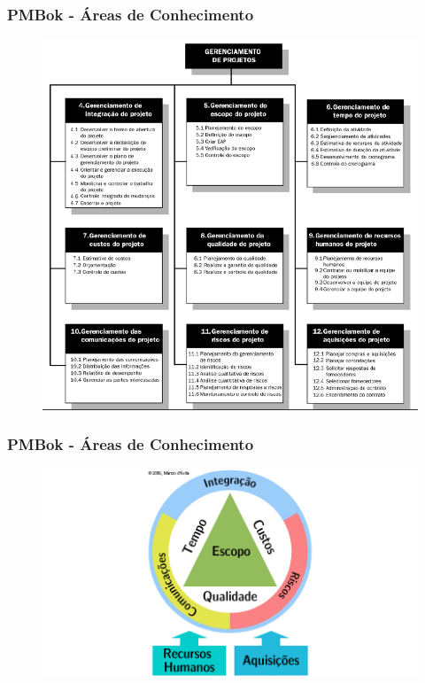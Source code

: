         \begin{frame}
 \frametitle{PMBok - Áreas de  Conhecimento}
 \begin{figure}
  \centering
  \includegraphics[height = \textheight]{figs/fig_proj7.png}
 \end{figure}
\end{frame}

      \begin{frame}
 \frametitle{PMBok - Áreas de  Conhecimento}
 \begin{figure}
  \centering
  \includegraphics[width = \textwidth]{figs/fig13.png}
 \end{figure}
\end{frame}


